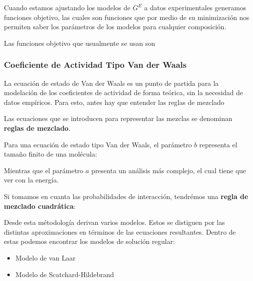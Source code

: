 Cuando estamos ajustando los modelos de $G^{E}$ a datos experimentales generamos funciones objetivo, las cuales son funciones que por medio de su minimización nos permiten saber los parámetros de los 
modelos para cualquier composición.

Las funciones objetivo que usualmente se usan son

\subsubsection{Coeficiente de Actividad Tipo Van der Waals}

La ecuación de estado de Van der Waals es un punto de partida para la modelación de los coeficientes de actividad
de forma teórica, sin la necesidad de datos empíricos. Para esto, antes hay que entender las reglas de mezclado


Las ecuaciones que se introducen para representar las mezclas se denominan \textbf{reglas de mezclado}.

Para una ecuación de estado tipo Van der Waals, el parámetro $b$ representa el tamaño finito de una molécula:


Mientras que el parámetro $a$ presenta un análisis más complejo, el cual tiene que ver con la energía.


Si tomamos en cuanta las probabilidades de interacción, tendrémos una \textbf{regla de mezclado cuadrática}:


Desde esta métodología derivan varios modelos. Estos se distiguen por las distintas aproximaciones en términos de las ecuaciones resultantes.
Dentro de estas podemos encontrar los modelos de solución regular:
\begin{itemize}
    \item Modelo de van Laar
    \item Modelo de Scatchard-Hildebrand
\end{itemize}

